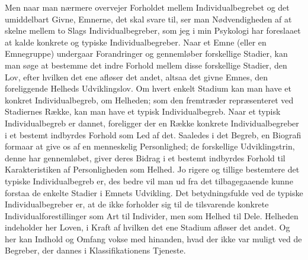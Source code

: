 \documentclass[12pt]{article}
\begin{document}
Men naar man nærmere overvejer Forholdet mellem Individualbegrebet og det
umiddelbart Givne, Emnerne, det skal svare til, ser man Nødvendigheden af at
skelne mellem to Slags Individualbegreber, som jeg i min Psykologi har foreslaaet
at kalde konkrete og typiske Individualbegreber. Naar et Emne (eller en
Emnegruppe) undergaar Forandringer og gennemløber forskellige Stadier, kan man søge
at bestemme det indre Forhold mellem disse forskellige Stadier, den Lov, efter
hvilken det ene afløser det andet, altsaa det givne Emnes, den foreliggende Helheds
Udviklingslov. Om hvert enkelt Stadium kan man have et konkret
Individualbegreb, om Helheden; som den fremtræder repræsenteret ved Stadiernes Række,
kan man have et typisk Individualbegreb. Naar et typisk Individualbegreb er dannet,
foreligger der en Række konkrete Individualbegreber i et bestemt indbyrdes
Forhold som Led af det. Saaledes i det Begreb, en Biografi formaar at give os af en
menneskelig Personlighed; de forskellige Udviklingstrin, denne har gennemløbet,
giver deres Bidrag i et bestemt indbyrdes Forhold til Karakteristiken af
Personligheden som Helhed. Jo rigere og tillige bestemtere det typiske
Individualbegreb er,
des bedre vil man ud fra det tilbagegaaende kunne forstaa de enkelte Stadier i
Emnets Udvikling. Det betydningsfulde ved de typiske Individualbegreber er, at
de ikke forholder sig til de tilsvarende konkrete Individualforestillinger som Art til
Individer, men som Helhed til Dele. Helheden indeholder her Loven, i Kraft af
hvilken det ene Stadium afløser det andet. Og her kan Indhold og Omfang vokse
med hinanden, hvad der ikke var muligt ved de Begreber, der dannes i
Klassifikationens Tjeneste.
\end{document}
